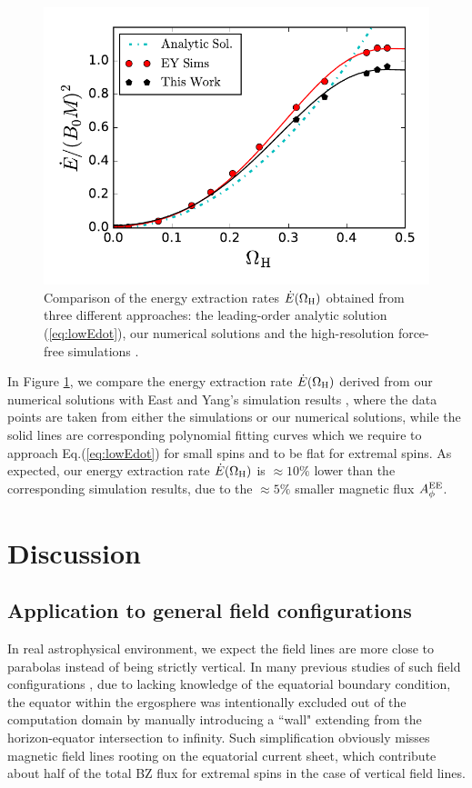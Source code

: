 \documentclass[aps,prd,reprint,nofootinbib, superscriptaddress]{revtex4-1}
\def\WH{\Omega_{\rm H}}
\def\AEE{A_\phi^{\rm EE}}
\begin{document}
\begin{figure}
\includegraphics[scale=0.7]{f3}
\caption{\label{fig:Edot} Comparison of the energy extraction rates $\dot E(\WH)$ obtained from
three different approaches: the leading-order analytic solution (\ref{eq:lowEdot}),
our numerical solutions and  the high-resolution force-free simulations \cite{East2018}.}
\end{figure}

In Figure \ref{fig:Edot}, we compare the energy extraction rate $\dot E(\WH)$
derived from our numerical solutions with East and Yang's simulation results
\cite{East2018}, where the data points are taken from either the simulations
or our numerical solutions, while the solid lines are corresponding polynomial
fitting curves which we require to approach Eq.(\ref{eq:lowEdot}) for small
spins and to be flat for extremal spins. As expected, our energy extraction
rate $\dot E(\WH)$ is $\approx 10\%$ lower than the corresponding simulation results,
due to the $\approx 5\%$ smaller magnetic flux $\AEE$.

\section{Discussion}
\label{sec:discussion}


\subsection{Application to general field configurations}
In real astrophysical environment, we expect the field lines are more close to parabolas instead of
being strictly vertical. In many previous studies of such field
configurations \cite[e.g.][]{Tchekhovskoy2010,Nathanail2014,Mahlmann2018},
due to lacking knowledge of the equatorial boundary condition, the
equator within the ergosphere was intentionally excluded out of the computation domain by manually
introducing a ``wall" extending from the horizon-equator intersection to infinity. Such
simplification obviously misses magnetic field lines rooting on the
equatorial current sheet, which contribute about half of the total BZ flux for extremal spins in
the case of vertical field lines.
\end{document}
